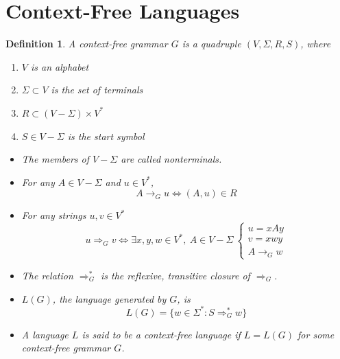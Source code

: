 \documentclass[aps,pra,onecolumn,notitlepage,superscriptaddress]{revtex4-1}
\newtheorem{defi}{Definition}
\begin{document}
\section{Context-Free Languages}
    \begin{defi}
        A context-free grammar $G$ is a quadruple $(V, \Sigma, R, S)$, where
        \begin{enumerate}
            \item $V$ is an alphabet
            \item $\Sigma \subset V$ is the set of terminals
            \item $R \subset (V - \Sigma) \times V^*$
            \item $S \in V - \Sigma$ is the start symbol 
        \end{enumerate}
        \begin{itemize}
            \item The members of $V-\Sigma$ are called nonterminals. 
            \item For any $A \in V-\Sigma$ and $u \in V^*$, 
            \begin{equation}
                A \to_G u \Longleftrightarrow (A,u) \in R 
            \end{equation}
            \item For any strings $u, v \in V^*$
            \begin{equation}
                u \Rightarrow_G v \Longleftrightarrow \exists x,y,w \in V^* ,\ A \in V - \Sigma \ \begin{cases}
                    u = xAy \\ v = xwy \\ A \to_G w
                \end{cases}
            \end{equation}
            \item The relation $\Rightarrow_G^*$ is the reflexive, transitive closure of $\Rightarrow_G$.
            \item $L(G)$, the language generated by $G$, is
            \begin{equation}
                L(G) = \{ w \in \Sigma^* : S \Rightarrow_G^* w \}
            \end{equation}
            \item A language $L$ is said to be a context-free language if $L = L(G)$ for some context-free grammar $G$.
        \end{itemize}
    \end{defi}
\end{document}
